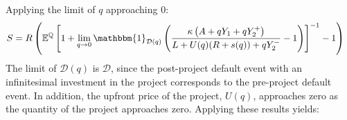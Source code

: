 \documentclass[../main.tex]{subfiles}
\begin{document}
        Applying the limit of $q$ approaching $0$:
            \begin{align}
                    S
                &=
                    \grossrfrate
                    \left(
                        \mathbb{E}^{\rnmeasure}\left[
                            1
                            +
                            \lim_{q\rightarrow 0}
                            \mathbbm{1}_{\mathcal{D}(q)}
                            \left(
                                \frac{
                                    \kappa 
                                    \left(
                                        A + q Y_{1} + q Y_{2}^{+}
                                    \right)
                                }{
                                    L 
                                    +
                                    U(q)
                                    (\grossrfrate + s(q))
                                    +
                                    q Y_{2}^{-} 
                                }
                                -
                                1
                            \right) 
                        \right]^{-1}
                        - 
                        1
                    \right)
                \nonumber
            \end{align}
        The limit of $\mathcal{D}(q)$ is $\mathcal{D}$,
        since the post-project default event with an infinitesimal investment in the project
        corresponds to the pre-project default event.
        In addition, the upfront price of the project, $U(q)$,
        approaches zero as the quantity of the project approaches zero.
        Applying these results yields:
\end{document}
